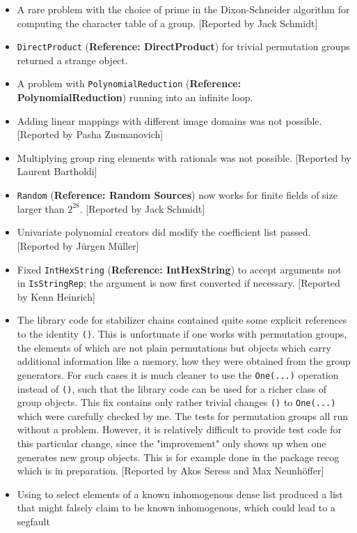 \documentclass[a4paper,11pt]{report}
\begin{document}
{{\begin{itemize}
\item  A rare problem with the choice of prime in the Dixon-Schneider algorithm for
computing the character table of a group. [Reported by Jack Schmidt] 
\item  \texttt{DirectProduct} (\textbf{Reference: DirectProduct}) for trivial permutation groups returned a strange object. 
\item  A problem with \texttt{PolynomialReduction} (\textbf{Reference: PolynomialReduction}) running into an infinite loop. 
\item  Adding linear mappings with different image domains was not possible.
[Reported by Pasha Zusmanovich] 
\item  Multiplying group ring elements with rationals was not possible. [Reported by
Laurent Bartholdi] 
\item  \texttt{Random} (\textbf{Reference: Random Sources}) now works for finite fields of size larger than $2^{28}$. [Reported by Jack Schmidt] 
\item  Univariate polynomial creators did modify the coefficient list passed.
[Reported by J{\"u}rgen M{\"u}ller] 
\item  Fixed \texttt{IntHexString} (\textbf{Reference: IntHexString}) to accept arguments not in \texttt{IsStringRep}; the argument is now first converted if necessary. [Reported by Kenn
Heinrich] 
\item  The library code for stabilizer chains contained quite some explicit
references to the identity \texttt{()}. This is unfortunate if one works with permutation groups, the elements of
which are not plain permutations but objects which carry additional
information like a memory, how they were obtained from the group generators.
For such cases it is much cleaner to use the \texttt{One(...)} operation instead of \texttt{()}, such that the library code can be used for a richer class of group objects.
This fix contains only rather trivial changes \texttt{()} to \texttt{One(...)} which were carefully checked by me. The tests for permutation groups all run
without a problem. However, it is relatively difficult to provide test code
for this particular change, since the "improvement" only shows up when one
generates new group objects. This is for example done in the package \textsf{recog} which is in preparation. [Reported by Akos Seress and Max Neunh{\"o}ffer] 
\item  Using \texttt{\texttt{}\texttt{}} to select elements of a known inhomogenous dense list produced a list that
might falsely claim to be known inhomogenous, which could lead to a segfault

\end{itemize}}}
\end{document}
